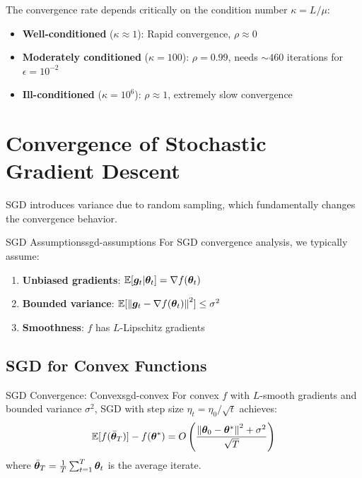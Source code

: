 \documentclass[../../main.tex]{subfiles}
\begin{document}
\begin{keyconcept}
The convergence rate depends critically on the condition number $\kappa = L/\mu$:
\begin{itemize}
    \item \textbf{Well-conditioned} ($\kappa \approx 1$): Rapid convergence, $\rho \approx 0$
    \item \textbf{Moderately conditioned} ($\kappa = 100$): $\rho = 0.99$, needs $\sim 460$ iterations for $\epsilon = 10^{-2}$
    \item \textbf{Ill-conditioned} ($\kappa = 10^6$): $\rho \approx 1$, extremely slow convergence
\end{itemize}
\end{keyconcept}

\section{Convergence of Stochastic Gradient Descent}
\label{sec:sgd-convergence-ch15}

SGD introduces variance due to random sampling, which fundamentally changes the convergence behavior.

\begin{definition}{SGD Assumptions}{sgd-assumptions}
For SGD convergence analysis, we typically assume:
\begin{enumerate}
    \item \textbf{Unbiased gradients}: $\operatorname{\mathbb{E}}[\boldsymbol{g}_t | \boldsymbol{\theta}_t] = \nabla f(\boldsymbol{\theta}_t)$
    \item \textbf{Bounded variance}: $\operatorname{\mathbb{E}}[\left\lVert \boldsymbol{g}_t - \nabla f(\boldsymbol{\theta}_t) \right\rVert^2] \leq \sigma^2$
    \item \textbf{Smoothness}: $f$ has $L$-Lipschitz gradients
\end{enumerate}
\end{definition}

\subsection{SGD for Convex Functions}

\begin{theorem}{SGD Convergence: Convex}{sgd-convex}
For convex $f$ with $L$-smooth gradients and bounded variance $\sigma^2$, SGD with step size $\eta_t = \eta_0/\sqrt{t}$ achieves:
\[
    \operatorname{\mathbb{E}}[f(\bar{\boldsymbol{\theta}}_T)] - f(\boldsymbol{\theta}^*) = O\left(\frac{\left\lVert \boldsymbol{\theta}_0 - \boldsymbol{\theta}^* \right\rVert^2 + \sigma^2}{\sqrt{T}}\right)
\]
where $\bar{\boldsymbol{\theta}}_T = \frac{1}{T}\sum_{t=1}^T \boldsymbol{\theta}_t$ is the average iterate.
\end{theorem}
\end{document}
